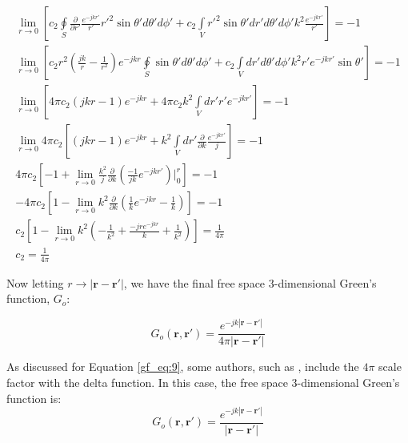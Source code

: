 \begin{equation}
\begin{gathered}
\lim_{r\to0}\left[c_2\oint\limits_{S}\frac{\partial }{\partial r'}\frac{e^{-jkr'}}{r'} r'^2\sin{\theta'} d\theta' d\phi '+ c_2\int\limits_{V}r'^2 \sin{\theta'}dr' d\theta' d\phi' k^2\frac{e^{-jkr'}}{r'}\right] = -1 \\
\lim_{r\to0}\left[c_2 r^2\left( \frac{jk}{r} - \frac{1}{r^2}\right)e^{-jkr}\oint\limits_{S}\sin{\theta'} d\theta' d\phi' + c_2\int\limits_{V}dr' d\theta' d\phi' k^2r'e^{-jkr'}\sin{\theta'}\right] = -1 \\
\lim_{r\to0}\left[4\pi c_2 \left( jkr - 1\right)e^{-jkr}+ 4\pi c_2k^2\int\limits_{V}dr' r'e^{-jkr'}\right] = -1 \\
\lim_{r\to0}4\pi c_2\left[\left( jkr - 1\right)e^{-jkr}+ k^2\int\limits_{V}dr' \frac{\partial}{\partial k}\frac{e^{-jkr'}}{j}\right] = -1 \\
4\pi c_2\left[-1 +  \lim_{r\to0}\frac{k^2}{j}\frac{\partial}{\partial k}\left( \frac{-1}{jk}e^{-jkr'}\right)\bigg|_0^{r}  \right] = -1 \\
-4\pi c_2\left[1 - \lim_{r\to0}k^2\frac{\partial}{\partial k}\left( \frac{1}{k}e^{-jkr} - \frac{1}{k}\right) \right] = -1 \\
c_2\left[1 - \lim_{r\to0}k^2\left(-\frac{1}{k^2}+\frac{-jre^{-jkr}}{k}+\frac{1}{k^2}\right) \right] = \frac{1}{4\pi} \\
 c_2 = \frac{1}{4\pi}
\end{gathered}
\label{gf_eq:25}
\end{equation}
\renewcommand{\baselinestretch}{2} \small\normalsize

Now letting $r \rightarrow |\mathbf{r}-\mathbf{r}'|$, we have the final free space 3-dimensional Green's function, $G_o$:

\begin{equation}
\boxed{G_o\left(\mathbf{r},\mathbf{r}'\right) = \frac{e^{-jk|\mathbf{r} - \mathbf{r}'|}}{4\pi |\mathbf{r} - \mathbf{r}'|}}
\label{gf_eq:26}
\end{equation}
\renewcommand{\baselinestretch}{2} \small\normalsize

As discussed for Equation \ref{gf_eq:9}, some authors, such as \cite{jackson_classical_em}, include the $4\pi$ scale factor with the delta function. In this case, the free space 3-dimensional Green's function is:
\begin{equation}
G_o\left(\mathbf{r},\mathbf{r}'\right)  = \frac{e^{-jk|\mathbf{r} - \mathbf{r}'|}}{|\mathbf{r} - \mathbf{r}'|}
\label{gf_eq:27}
\end{equation}
\renewcommand{\baselinestretch}{2} \small\normalsize

